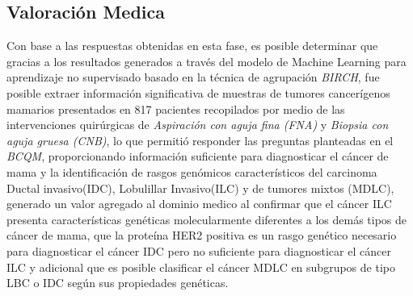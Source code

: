 \subsection{Valoración Medica}
Con base a las respuestas obtenidas en esta fase, es posible determinar que gracias a los resultados generados a través del modelo de Machine Learning para aprendizaje no supervisado basado en la técnica de agrupación \textit{BIRCH}, fue posible extraer información significativa de muestras de tumores cancerígenos mamarios presentados en 817 pacientes recopilados por medio de las intervenciones quirúrgicas de \textit{Aspiración con aguja fina (FNA)} y \textit{Biopsia con aguja gruesa (CNB)}, lo que permitió responder las preguntas planteadas en el \textit{BCQM}, proporcionando información suficiente para diagnosticar el cáncer de mama y la identificación de  rasgos genómicos característicos del carcinoma Ductal invasivo(IDC), Lobulillar Invasivo(ILC) y de tumores mixtos (MDLC), generado un valor agregado al dominio medico al confirmar que el cáncer ILC presenta características genéticas molecularmente diferentes a los demás tipos de cáncer de mama, que  la proteína HER2 positiva es un rasgo genético necesario para diagnosticar el cáncer IDC pero no suficiente para diagnosticar el cáncer ILC y adicional que es posible clasificar el cáncer MDLC en subgrupos de tipo LBC o IDC según sus propiedades genéticas.


